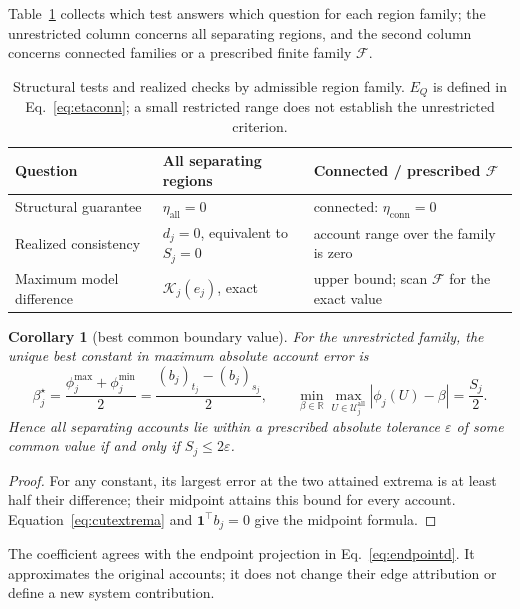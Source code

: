 \documentclass[a4paper,fleqn]{cas-sc}
\newtheorem{corollary}[theorem]{Corollary}
\begin{document}
Table~\ref{tab:familytests} collects which test answers which question for
each region family; the unrestricted column concerns all separating
regions, and the second column concerns connected families or a prescribed
finite family $\mathcal F$.
\begin{table}[pos=tb]
\caption{Structural tests and realized checks by admissible region family.
$E_Q$ is defined in Eq.~\eqref{eq:etaconn}; a small restricted range does
not establish the unrestricted criterion.}\label{tab:familytests}
\begin{tabular*}{\tblwidth}{@{\extracolsep{\fill}}lll}
\toprule
Question & All separating regions & Connected / prescribed $\mathcal F$\\
\midrule
Structural guarantee & $\eta_{\mathrm{all}}=0$ & connected: $\eta_{\mathrm{conn}}=0$\\
Realized consistency & $d_j=0$, equivalent to $S_j=0$ & account range over the family is zero\\
Maximum model difference & $\mathcal K_j(e_j)$, exact & upper bound; scan $\mathcal F$ for the exact value\\
\bottomrule\end{tabular*}\end{table}

\begin{corollary}[best common boundary value]\label{cor:approxinterchange}
For the unrestricted family, the unique best constant in maximum absolute
account error is
\[
\beta_j^\star=\frac{\phi_j^{\max}+\phi_j^{\min}}2
=\frac{(b_j)_{t_j}-(b_j)_{s_j}}2,\qquad
\min_{\beta\in\mathbb R}\max_{U\in\mathcal U_j^{\mathrm{all}}}
|\phi_j(U)-\beta|=\frac{S_j}{2}.
\]
Hence all separating accounts lie within a prescribed absolute tolerance
$\varepsilon$ of some common value if and only if $S_j\le2\varepsilon$.
\end{corollary}
\begin{proof}
For any constant, its largest error at the two attained extrema is at least
half their difference; their midpoint attains this bound for every account.
Equation~\eqref{eq:cutextrema} and $\mathbf1^\top b_j=0$ give the midpoint formula.
\end{proof}
The coefficient agrees with the endpoint projection in
Eq.~\eqref{eq:endpointd}. It approximates the original accounts; it does
not change their edge attribution or define a new system contribution.
\end{document}
